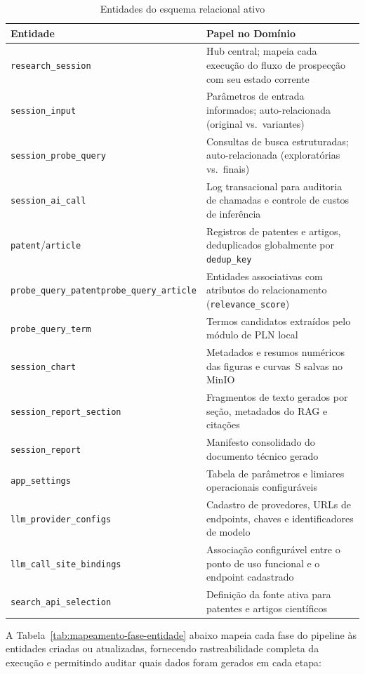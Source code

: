 \documentclass[12pt, a4paper]{article}
\begin{document}
\begin{table}[H]
\centering
\caption{Entidades do esquema relacional ativo}
\label{tab:entidades-bd}
\begin{tabular}{p{5.0cm}p{9.6cm}}
\toprule
\textbf{Entidade} & \textbf{Papel no Domínio} \\
\midrule
\texttt{research\_session} & Hub central; mapeia cada execução do fluxo de prospecção com seu estado corrente \\
\texttt{session\_input} & Parâmetros de entrada informados; auto-relacionada (original vs.\ variantes) \\
\texttt{session\_probe\_query} & Consultas de busca estruturadas; auto-relacionada (exploratórias vs.\ finais) \\
\texttt{session\_ai\_call} & Log transacional para auditoria de chamadas e controle de custos de inferência \\
\texttt{patent}\slash\texttt{article} & Registros de patentes e artigos, deduplicados globalmente por \texttt{dedup\_key} \\
\texttt{probe\_query\_patent}\newline\texttt{probe\_query\_article} & Entidades associativas com atributos do relacionamento (\texttt{relevance\_score}) \\
\texttt{probe\_query\_term} & Termos candidatos extraídos pelo módulo de PLN local \\
\texttt{session\_chart} & Metadados e resumos numéricos das figuras e curvas~S salvas no MinIO \\
\texttt{session\_report\_section} & Fragmentos de texto gerados por seção, metadados do RAG e citações \\
\texttt{session\_report} & Manifesto consolidado do documento técnico gerado \\
\texttt{app\_settings} & Tabela de parâmetros e limiares operacionais configuráveis \\
\texttt{llm\_provider\_configs} & Cadastro de provedores, URLs de endpoints, chaves e identificadores de modelo \\
\texttt{llm\_call\_site\_bindings} & Associação configurável entre o ponto de uso funcional e o endpoint cadastrado \\
\texttt{search\_api\_selection} & Definição da fonte ativa para patentes e artigos científicos \\
\bottomrule
\end{tabular}
\end{table}

  A Tabela~\ref{tab:mapeamento-fase-entidade} abaixo mapeia cada fase do pipeline às entidades criadas ou atualizadas, fornecendo rastreabilidade completa da execução e permitindo auditar quais dados foram gerados em cada etapa:
\end{document}
